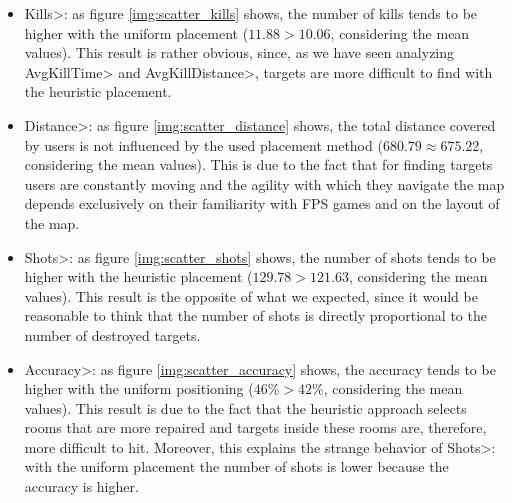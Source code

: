\begin{itemize}
\item \<Kills>: as figure \ref{img:scatter_kills} shows, the number of kills tends to be higher with the uniform placement ($11.88 > 10.06$, considering the mean values). This result is rather obvious, since, as we have seen analyzing \<AvgKillTime> and \<AvgKillDistance>, targets are more difficult to find with the heuristic placement.
\item \<Distance>: as figure \ref{img:scatter_distance} shows, the total distance covered by users is not influenced by the used placement method ($680.79\approx675.22$, considering the mean values). This is due to the fact that for finding targets users are constantly moving and the agility with which they navigate the map depends exclusively on their familiarity with FPS games and on the layout of the map.
\item \<Shots>: as figure \ref{img:scatter_shots} shows, the number of shots tends to be higher with the heuristic placement ($129.78 >  121.63$, considering the mean values). This result is the opposite of what we expected, since it would be reasonable to think that the number of shots is directly proportional to the number of destroyed targets.
\item \<Accuracy>: as figure \ref{img:scatter_accuracy} shows, the accuracy tends to be higher with the uniform positioning ($46\% > 42\%$, considering the mean values). This result is due to the fact that the heuristic approach selects rooms that are more repaired and targets inside these rooms are, therefore, more difficult to hit. Moreover, this explains the strange behavior of \<Shots>: with the uniform placement the number of shots is lower because the accuracy is higher.
\end{itemize}

